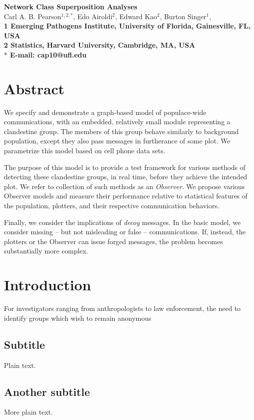 \documentclass{article}
\begin{document}
\begin{flushleft}
{\Large
\textbf{Network Class Superposition Analyses}
}
\\
Carl A. B. Pearson$^{1,2,\ast}$, 
Edo Airoldi$^{2}$, 
Edward Kao$^{2}$,
Burton Singer$^{1}$, 
\\
\bf{1} Emerging Pathogens Institute, University of Florida, Gainesville, FL, USA
\\
\bf{2} Statistics, Harvard University, Cambridge, MA, USA
\\
$\ast$ E-mail: cap10@ufl.edu
\end{flushleft}
\section*{Abstract}
We specify and demonstrate a graph-based model of populace-wide communications, with an embedded, relatively small module representing a clandestine group.  The members of this group behave similarly to background population, except they also pass messages in furtherance of some plot.  We parametrize this model based on cell phone data sets.

The purpose of this model is to provide a test framework for various methods of detecting these clandestine groups, in real time, before they achieve the intended plot.  We refer to collection of such methods as an {\em Observer}.  We propose various Observer models and measure their performance relative to statistical features of the population, plotters, and their respective communication behaviors.

Finally, we consider the implications of {\em decoy} messages.  In the basic model, we consider missing -- but not misleading or false -- communications.  If, instead, the plotters or the Observer can issue forged messages, the problem becomes substantially more complex.

\section*{Introduction}
For investigators ranging from anthropologists to law enforcement, the need to identify groups which wish to remain anonymous

\subsection{Subtitle}

Plain text.

\subsection{Another subtitle}

More plain text.
\end{document}
